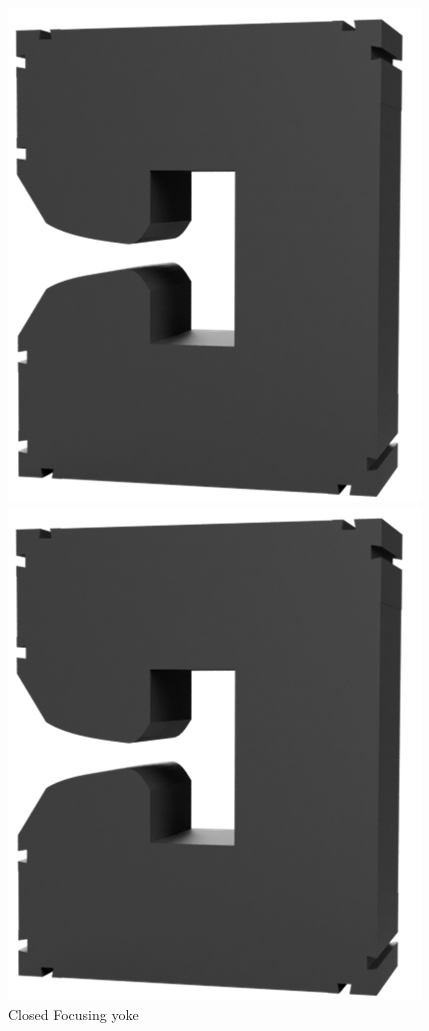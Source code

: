 \documentclass[a4paper,
               biblatex,     %
               keeplastbox,   %
               ]{jacow}
\begin{document}
\begin{figure}[!htb]
  \centering
  \begin{minipage}[b]{0.45\columnwidth}
    \includegraphics*[width=\textwidth]{focusing}
    \caption{Closed Focusing yoke}
    \label{fig:focusing}
  \end{minipage}
  \hfill
  \begin{minipage}[b]{0.45\columnwidth}
    \includegraphics*[width=\textwidth]{focusing}

\end{minipage}
\end{figure}
\end{document}
